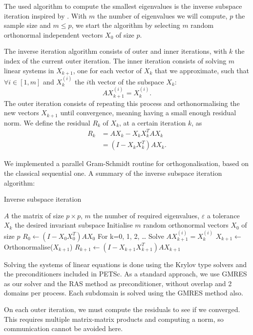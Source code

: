 The used algorithm to compute the smallest eigenvalues is the inverse subspace iteration inspired by \cite{el_khoury_acceleration_2014}.
With \(m\) the number of eigenvalues we will compute, \(p\) the sample size and \(m \le p\), we start the algorithm by selecting \(m\) random orthonormal independent vectors \(X_0\) of size \(p\).

The inverse iteration algorithm consists of outer and inner iterations, with \(k\) the index of the current outer iteration.
The inner iteration consists of solving \(m\) linear systems in \(X_{k+1}\), one for each vector of \(X_k\) that we approximate, such that \(\forall i \in [1, m]\) and \(X_k^{(i)}\) the \(i\)th vector of the subspace \(X_k\):
\[A X_{k+1}^{(i)} = X_k^{(i)}.\]
The outer iteration consists of repeating this process and orthonormalising the new vectors \(X_{k+1}\) until convergence, meaning having a small enough residual norm.
We define the residual \(R_k\) of \(X_k\), at a certain iteration \(k\), as
\begin{equation}
 \begin{split}
  R_k & = A X_k - X_k X_k^T A X_k \\
      & = (I - X_k X_k^T) A X_k.
 \end{split}
\end{equation}

We implemented a parallel Gram-Schmidt routine for orthogonalisation, based on the classical sequential one.
A summary of the inverse subspace iteration algorithm:

\begin{algorithm}[H]
 \caption{Inverse subspace iteration}
 \begin{algorithmic}
  \REQUIRE \(A\) the matrix of size \(p \times p\), \(m\) the number of required eigenvalues, \(\varepsilon\) a tolerance
  \ENSURE \(X_k\) the desired invariant subspace
  \STATE Initialise \(m\) random orthonormal vectors \(X_0\) of size \(p\)
  \STATE \(R_0 \gets (I - X_0 X_0^T) A X_0\)
  \STATE For k=0, 1, 2, \dots
    \STATE Solve \(A X_{k+1}^{(i)} = X_k^{(i)}\)
   \ENDFOR
   \STATE \(X_{k+1} \gets \) Orthonormalise(\(X_{k+1}\))
   \STATE \(R_{k+1} \gets (I - X_{k+1} X_{k+1}^T) A X_{k+1}\)
  \ENDWHILE
 \end{algorithmic}
\end{algorithm}

Solving the systems of linear equations is done using the Krylov type solvers and the preconditioners included in PETSc.
As a standard approach, we use GMRES as our solver and the RAS method as preconditioner, without overlap and 2 domains per process.
Each subdomain is solved using the GMRES method also.

On each outer iteration, we must compute the residuals to see if we converged.
This requires multiple matrix-matrix products and computing a norm, so communication cannot be avoided here.
